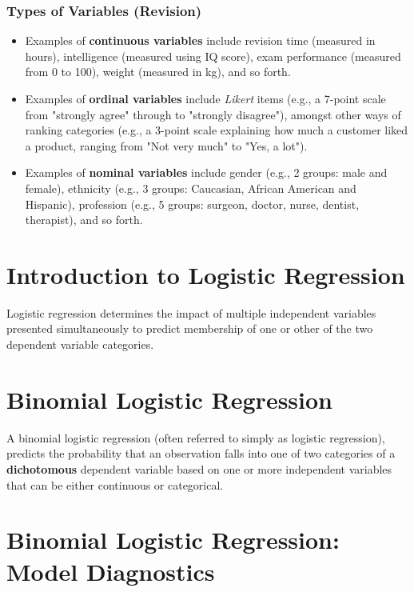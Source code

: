 \documentclass[12pt, a4paper]{article}
\author{ } \date{ }
\theoremstyle{plain}
\theoremstyle{definition}
\theoremstyle{remark}
\begin{document}
\tableofcontents
\newpage

\begin{framed}

	\subsubsection*{Types of Variables (Revision)}
	\begin{itemize}
		\item Examples of \textbf{continuous variables} include revision time (measured in hours), intelligence (measured using IQ score), exam performance (measured from 0 to 100), weight (measured in kg), and so forth. 
		
		\item Examples of \textbf{ordinal variables} include \textit{Likert} items (e.g., a 7-point scale from "strongly agree" through to "strongly disagree"), amongst other ways of ranking categories (e.g., a 3-point scale explaining how much a customer liked a product, ranging from "Not very much" to "Yes, a lot"). 
		\item Examples of \textbf{nominal variables} include gender (e.g., 2 groups: male and female), ethnicity (e.g., 3 groups: Caucasian, African American and Hispanic), profession (e.g., 5 groups: surgeon, doctor, nurse, dentist, therapist), and so forth.
	\end{itemize}
\end{framed}
	\newpage
\section*{Introduction to Logistic Regression}

Logistic regression determines the impact of multiple independent variables
presented simultaneously to predict membership of one or other of the two
dependent variable categories.

\section{Binomial Logistic Regression} 
A binomial logistic regression (often referred to simply as logistic regression), predicts the probability that an observation falls into one of two categories of a \textbf{dichotomous} dependent variable based on one or more independent variables that can be either continuous or categorical.

\section{Binomial Logistic Regression: Model Diagnostics}
\end{document}
